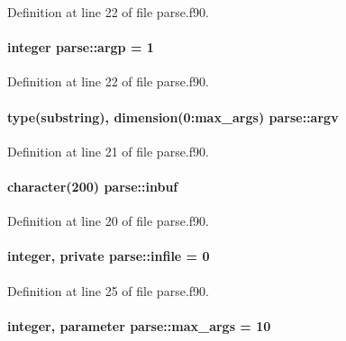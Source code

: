 Definition at line 22 of file parse.\-f90.

\hypertarget{classparse_af224a4f20e8b2bd2ee132df0d2e471f9}{
\paragraph[{argp}]{\setlength{\rightskip}{0pt plus 5cm}integer parse\-::argp = 1}}\label{classparse_af224a4f20e8b2bd2ee132df0d2e471f9}


Definition at line 22 of file parse.\-f90.

\hypertarget{classparse_a1efebe34a6731dd52a87135aaaa24f7a}{
\paragraph[{argv}]{\setlength{\rightskip}{0pt plus 5cm}type({\bf substring}), dimension(0\-:{\bf max\-\_\-args}) parse\-::argv}}\label{classparse_a1efebe34a6731dd52a87135aaaa24f7a}


Definition at line 21 of file parse.\-f90.

\hypertarget{classparse_a5ed9415ec38213bcae027d4e1b47e70d}{
\paragraph[{inbuf}]{\setlength{\rightskip}{0pt plus 5cm}character(200) parse\-::inbuf}}\label{classparse_a5ed9415ec38213bcae027d4e1b47e70d}


Definition at line 20 of file parse.\-f90.

\hypertarget{classparse_a41e02cf4a2db631678f15e65d28465fc}{
\paragraph[{infile}]{\setlength{\rightskip}{0pt plus 5cm}integer, private parse\-::infile = 0\hspace{0.3cm}{\ttfamily [private]}}}\label{classparse_a41e02cf4a2db631678f15e65d28465fc}


Definition at line 25 of file parse.\-f90.

\hypertarget{classparse_a8b0a79d83e5d7aae1e44e5f32f50618f}{
\paragraph[{max\-\_\-args}]{\setlength{\rightskip}{0pt plus 5cm}integer, parameter parse\-::max\-\_\-args = 10}}\label{classparse_a8b0a79d83e5d7aae1e44e5f32f50618f}


